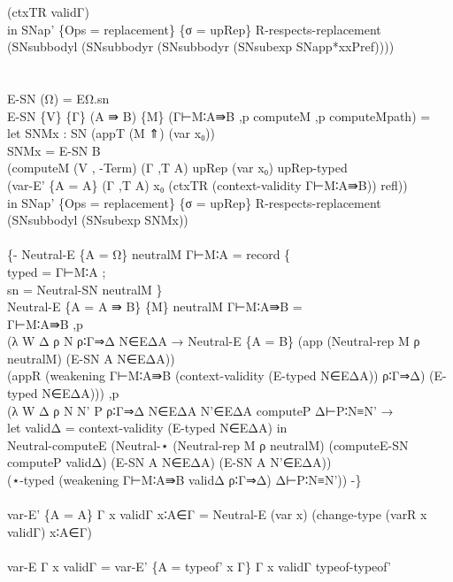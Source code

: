{\begin{code}
{\>          (ctxTR validΓ)\<\\
\>  in SNap' \{Ops = replacement\} \{σ = upRep\} R-respects-replacement (SNsubbodyl (SNsubbodyr (SNsubbodyr (SNsubexp SNapp*xxPref))))\<\\
\>\<\\
\>\<\\
\>E-SN (Ω) = EΩ.sn\<\\
\>E-SN \{V\} \{Γ\} (A ⇛ B) \{M\} (Γ⊢M∶A⇛B ,p computeM ,p computeMpath) =\<\\
\>  let SNMx : SN (appT (M ⇑) (var x₀))\<\\
\>      SNMx = E-SN B \<\\
\>             (computeM (V , -Term) (Γ ,T A) upRep (var x₀) upRep-typed \<\\
\>             (var-E' \{A = A\} (Γ ,T A) x₀ (ctxTR (context-validity Γ⊢M∶A⇛B)) refl)) \<\\
\>  in SNap' \{Ops = replacement\} \{σ = upRep\} R-respects-replacement (SNsubbodyl (SNsubexp SNMx)) \<\\
\>\<\\
\>\{- Neutral-E \{A = Ω\} neutralM Γ⊢M∶A = record \{ \<\\
\>  typed = Γ⊢M∶A ; \<\\
\>  sn = Neutral-SN neutralM \}\<\\
\>Neutral-E \{A = A ⇛ B\} \{M\} neutralM Γ⊢M∶A⇛B = \<\\
\>  Γ⊢M∶A⇛B ,p \<\\
\>  (λ W Δ ρ N ρ∶Γ⇒Δ N∈EΔA → Neutral-E \{A = B\} (app (Neutral-rep M ρ neutralM) (E-SN A N∈EΔA)) \<\\
\>    (appR (weakening Γ⊢M∶A⇛B (context-validity (E-typed N∈EΔA)) ρ∶Γ⇒Δ) (E-typed N∈EΔA))) ,p \<\\
\>  (λ W Δ ρ N N' P ρ∶Γ⇒Δ N∈EΔA N'∈EΔA computeP Δ⊢P∶N≡N' → \<\\
\>    let validΔ = context-validity (E-typed N∈EΔA) in\<\\
\>    Neutral-computeE (Neutral-⋆ (Neutral-rep M ρ neutralM) (computeE-SN computeP validΔ) (E-SN A N∈EΔA) (E-SN A N'∈EΔA)) \<\\
\>    (⋆-typed (weakening Γ⊢M∶A⇛B validΔ ρ∶Γ⇒Δ) Δ⊢P∶N≡N')) -\}\<\\
\>\<\\
\>var-E' \{A = A\} Γ x validΓ x∶A∈Γ = Neutral-E (var x) (change-type (varR x validΓ) x∶A∈Γ)\<\\
\>\<\\
\>var-E Γ x validΓ = var-E' \{A = typeof' x Γ\} Γ x validΓ typeof-typeof'\<\\
}
\end{code}}
